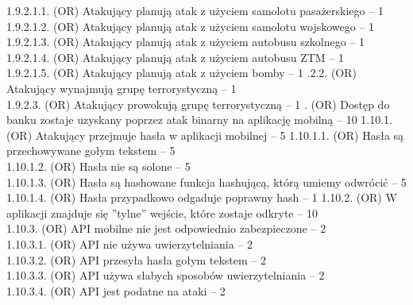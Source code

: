 \documentclass[10pt,a4paper,twoside]{article}
\newenvironment{subs}
{\adjustwidth{3em}{0pt}}
{\endadjustwidth}
\begin{document}
\begin{subs}
\begin{subs}
\begin{subs}
                \begin{subs}
                    1.9.2.1.1. (OR) Atakujący planują atak z użyciem samolotu pasażerskiego -- 1 \\
                    1.9.2.1.2. (OR) Atakujący planują atak z użyciem samolotu wojskowego -- 1 \\
                    1.9.2.1.3. (OR) Atakujący planują atak z użyciem autobusu szkolnego -- 1 \\
                    1.9.2.1.4. (OR) Atakujący planują atak z użyciem autobusu ZTM -- 1 \\
                    1.9.2.1.5. (OR) Atakujący planują atak z użyciem bomby -- 1
                \end{subs}
                1.9.2.2. (OR) Atakujący wynajmują grupę terrorystyczną -- 1 \\
                1.9.2.3. (OR) Atakujący prowokują grupę terrorystyczną -- 1
            \end{subs}
        \end{subs}
        1.10. (OR) Dostęp do banku zostaje uzyskany poprzez atak binarny na aplikację mobilną -- 10
        \begin{subs}
            1.10.1. (OR) Atakujący przejmuje hasła w aplikacji mobilnej -- 5
            \begin{subs}
                1.10.1.1. (OR) Hasła są przechowywane gołym tekstem -- 5 \\
                1.10.1.2. (OR) Hasła nie są solone -- 5 \\
                1.10.1.3. (OR) Hasła są hashowane funkcja hashującą, którą umiemy odwrócić -- 5 \\
                1.10.1.4. (OR) Hasła przypadkowo odgaduje poprawny hash -- 1
            \end{subs}
            1.10.2. (OR) W aplikacji znajduje się ''tylne'' wejście, które zostaje odkryte -- 10\\
            1.10.3. (OR) API mobilne nie jest odpowiednio zabezpieczone -- 2 \\
            \begin{subs}
                1.10.3.1. (OR) API nie używa uwierzytelniania -- 2 \\
                1.10.3.2. (OR) API przesyła hasła gołym tekstem -- 2 \\
                1.10.3.3. (OR) API używa słabych sposobów uwierzytelniania -- 2 \\
                1.10.3.4. (OR) API jest podatne na ataki -- 2

\end{subs}
\end{subs}
\end{subs}
\end{document}
